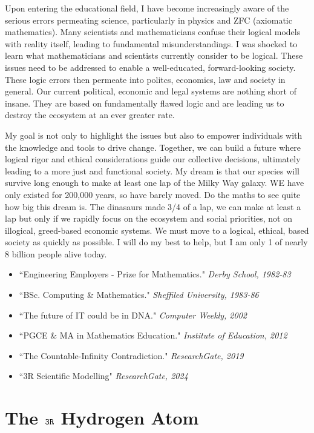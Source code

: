 \documentclass[12pt]{article}
\begin{document}
Upon entering the educational field, I have become increasingly aware of the serious errors permeating science, particularly in physics and ZFC (axiomatic mathematics). Many scientists and mathematicians confuse their logical models with reality itself, leading to fundamental misunderstandings. I was shocked to learn what mathematicians and scientists currently consider to be logical. These issues need to be addressed to enable a well-educated, forward-looking society. These logic errors then permeate into politcs, economics, law and society in general. Our current political, economic and legal systems are nothing short of insane. They are based on fundamentally flawed logic and are leading us to destroy the ecosystem at an ever greater rate.

My goal is not only to highlight the issues but also to empower individuals with the knowledge and tools to drive change. Together, we can build a future where logical rigor and ethical considerations guide our collective decisions, ultimately leading to a more just and functional society. My dream is that our species will survive long enough to make at least one lap of the Milky Way galaxy. WE have only existed for 200,000 years, so have barely moved. Do the maths to see quite how big this dream is. The dinasaurs made 3/4 of a lap, we can make at least a lap but only if we rapidly focus on the ecosystem and social priorities, not on illogical, greed-based economic systems. We must move to a logical, ethical, \iR{} based society as quickly as possible. I will do my best to help, but I am only 1 of nearly 8 billion people alive today. 
\begin{itemize}
\item ``Engineering Employers - Prize for Mathematics." \textit{Derby School, 1982-83}
\item ``BSc. Computing \& Mathematics." \textit{Sheffiled University, 1983-86}
\item ``The future of IT could be in DNA." \textit{Computer Weekly, 2002}
\item ``PGCE \& MA in Mathematics Education." \textit{Institute of Education, 2012}
\item ``The Countable-Infinity Contradiction." \textit{ResearchGate, 2019}
\item ``3R Scientific Modelling" \textit{ResearchGate, 2024}
\end{itemize}

\section*{The \(\texttt{3R}\) Hydrogen Atom}
\end{document}
